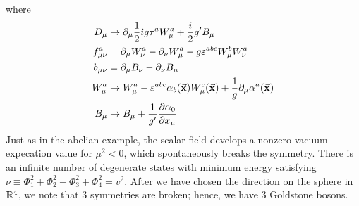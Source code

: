 \documentclass[../main/main.tex]{subfiles}
\begin{document}
where
\begin{subequations}
\begin{align*}
     D_ \mu  &\rightarrow \partial_ \mu \frac{1}{2} i g \tau ^a W_ \mu ^a + \frac{i}{2} g' B _ \mu \\
  f_ {\mu \nu }^a &= \partial_ \mu W_ \nu ^a - \partial_ \nu W _ \mu ^a - g \varepsilon ^{abc} W _ \mu ^b  W_ \nu ^a \\
  b_ {\mu \nu } &= \partial_ \mu B _ \nu - \partial_ \nu  B _ \mu \\
  W_ \mu ^a & \rightarrow W_ \mu ^a - \varepsilon ^{abc} \alpha _b (\va{x}) W_ \mu ^c (\va{x}) + \frac{1}{g} \partial_ \mu \alpha ^a (\va{x})    \\
  B _ \mu  & \rightarrow  B _ \mu + \frac{1}{g'} \pdv{\alpha _0}{x_ \mu }
\end{align*}
\end{subequations}
Just as in the abelian example, the scalar field develops a nonzero vacuum expecation value for \( \mu ^2 <0 \), which spontaneously breaks the symmetry. There is an infinite number of degenerate states with minimum energy satisfying  \( \nu \equiv  \Phi _1^2 + \Phi _2^2 + \Phi _3^2 +\Phi _4^2 = v^2 \). After we have chosen the direction on the sphere in  \( \mathbb{R}^4 \), we note that 3 symmetries are broken; hence, we have 3 Goldstone bosons.
\end{document}
